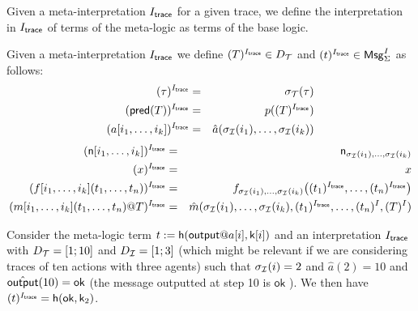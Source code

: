 %

Given a meta-interpretation $I_{\textsf{trace}}$ for a given trace, we define the
interpretation in $I_{\textsf{trace}}$ of terms of the meta-logic as terms of the base logic.

\begin{definition}
  Given a meta-interpretation $I_{\textsf{trace}}$
  we define $(T)^{I_{\textsf{trace}}} \in D_{\mathcal{T}}$ and $(t)^{I_{\textsf{trace}}} \in \mathsf{Msg}^I_\Sigma$ as follows:
  \begin{eqnarray*}
    (\tau)^{I_{\textsf{trace}}} &=& \sigma_{\mathcal{T}}(\tau) \\
    (\textsf{pred}(T))^{I_{\textsf{trace}}} &=& p((T)^{I_{\textsf{trace}}}) \\
    (a[i_1,\ldots,i_k])^{I_{\textsf{trace}}} &=& \hat{a}(\sigma_{\mathcal{I}}(i_1),\ldots,\sigma_{\mathcal{I}}(i_k))
  \end{eqnarray*}
  \begin{eqnarray*}
    (\mathsf{n}[i_1,\ldots,i_k])^{I_{\textsf{trace}}} &=& \mathsf{n}_{\sigma_{\mathcal{I}}(i_1),\ldots,\sigma_{\mathcal{I}}(i_k)}
    \\
    (x)^{I_{\textsf{trace}}} &=& x
    \\
    (f[i_1,\ldots,i_k](t_1,\ldots,t_n))^{I_{\textsf{trace}}} &=&
    f_{\sigma_{\mathcal{I}}(i_1),\ldots,\sigma_{\mathcal{I}}(i_k)}\bigl(
      (t_1)^{I_{\textsf{trace}}},\ldots,(t_n)^{I_{\textsf{trace}}}
    \bigr)
    \\
    (m[i_1,\ldots,i_k](t_1,\ldots,t_n)@T)^{I_{\textsf{trace}}} &=&
    \hat{m}(\sigma_{\mathcal{I}}(i_1),\ldots,\sigma_{\mathcal{I}}(i_k),
      (t_1)^{I_{\textsf{trace}}},\ldots,(t_n)^{I},
      (T)^{I})
  \end{eqnarray*}
\end{definition}

\begin{example}
  Consider the meta-logic term $t := \mathsf{h}(\mout@a[i],\mathsf{k}[i])$
  and an interpretation $I_{\textsf{trace}}$ with $D_{\mathcal{T}} = [1;10]$ and $D_{\mathcal{I}} = [1;3]$
  (which might be relevant if we are considering traces of ten actions
  with three agents) such that $\sigma_{\mathcal{I}}(i)=2$ and $\hat{a}(2)=10$
  and $\hat{\textsf{output}}(10)=\mathsf{ok}$ (the message outputted at step 10
  is $\mathsf{ok}$ ).
  We then have $(t)^{I_{\textsf{trace}}} = \mathsf{h}(\mathsf{ok},\mathsf{k}_2)$.
\end{example}

